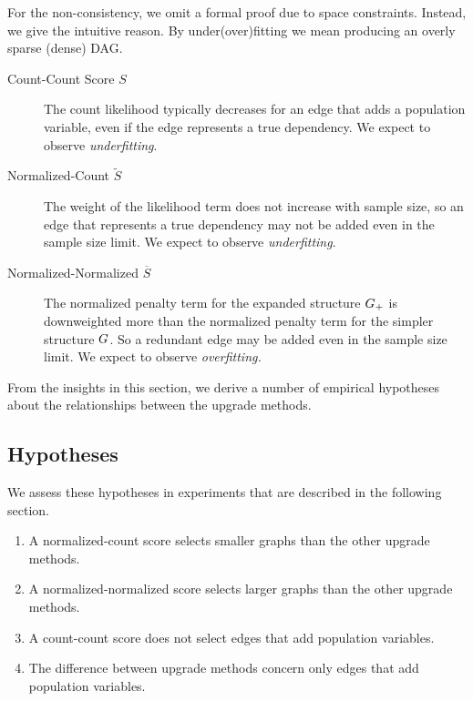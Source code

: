 \documentclass[letterpaper]{article}
\begin{document}
For the non-consistency, we omit a formal proof due to space constraints. Instead, we give the intuitive reason. 
By under(over)fitting we mean producing an overly sparse (dense) DAG.

\begin{description}
\item[Count-Count Score $S$]  The count likelihood typically decreases for an edge that adds a population variable, even if the edge represents a true dependency. We expect to observe {\em underfitting}.
\item[Normalized-Count $\widetilde{S}$] The weight of the likelihood term does not increase with sample size, so an edge that represents a true dependency may not be added even in the sample size limit. We expect to observe {\em underfitting}.
\item[Normalized-Normalized $\overline{S}$] The normalized penalty term for the expanded structure $G_{+}$ is downweighted more than the normalized penalty term for the simpler structure $G$. So a redundant edge may be added even in the sample size limit. We expect to observe {\em overfitting.} 
\end{description}



%

From the insights in this section, we derive a number of empirical hypotheses about the relationships between the upgrade methods. 

\subsection{Hypotheses} We assess these hypotheses in experiments that are described in the following section.

\begin{enumerate}
\item A normalized-count score selects smaller graphs than the other upgrade methods. \label{hyp:weighted}
\item A normalized-normalized score selects larger graphs than the other upgrade methods.\label{hyp:normalized} 
\item A count-count score does not select edges that add population variables. \label{hyp:noadd}
\item The difference between upgrade methods concern only edges that add population variables. \label{hyp:contained}
\end{enumerate}
\end{document}
